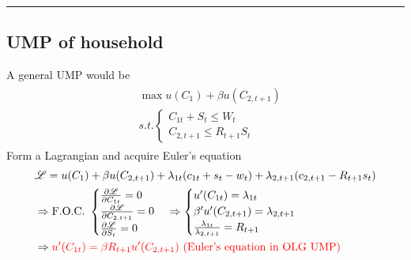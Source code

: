 \documentclass{article}
\newcommand*\sepline{%
  \begin{center}
    \rule[1ex]{.5\textwidth}{.5pt}
  \end{center}}
\begin{document}
\sepline
\subsection{UMP of household}
A general UMP would be
\begin{align}
\begin{split}
&\max u (C_{1})+\beta u (C_{2,t+1})
\\&s.t.  
\begin{cases}C_{1t}+S_{t} \leqslant W_{t} \\
C_{2,t+1}\leqslant R_{t+1} S_{t}
\end{cases}
\end{split}
\end{align}
Form a Lagrangian and acquire Euler's equation
\begin{align}
&\mathscr{L}=u (C_{1})+\beta u (C_{2,t+1})+\lambda_{1t}(c_{1t}+s_{t} - w_{t})+\lambda_{2,t+1}(c_{2,t+1}- R_{t+1} s_{t})
\\&\Rightarrow \text{F.O.C. }\begin{cases}
\frac{\partial \mathscr{L}}{\partial C_{1t}}=0 \\
\frac{\partial \mathscr{L}}{\partial C_{2,t+1}}=0 \\
\frac{\partial \mathscr{L}}{\partial S_{t}}=0\end{cases}
\Rightarrow 
\begin{cases}
u'(C_{1t})=\lambda_{1t} \\
\beta' u'(C_{2,t+1})=\lambda_{2,t+1} \\
\frac{\lambda_{1t}}{\lambda_{2,t+1}}=R_{t+1}\end{cases}
\\&\Rightarrow \color{red} u'(C_{1t})=\beta R_{t+1} u'(C_{2,t+1}) \text{ (Euler's equation in OLG UMP)}
\end{align}
\end{document}
